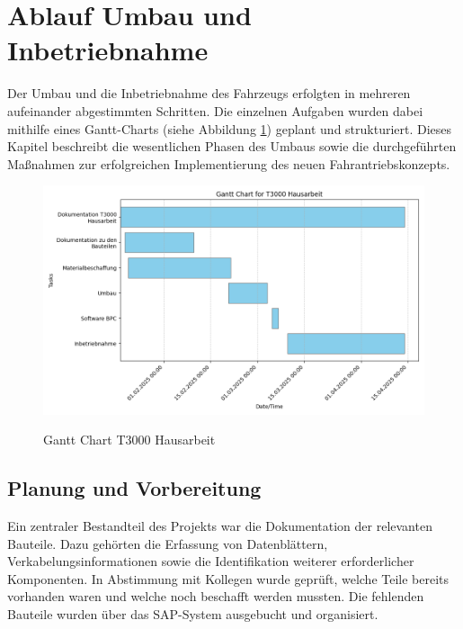 \documentclass[a4paper, 12pt]{article} %
\begin{document}
\section{Ablauf Umbau und Inbetriebnahme}
\begin{spacing}{1.5}  %
    \fontsize{14pt}{14pt}\selectfont  %

Der Umbau und die Inbetriebnahme des Fahrzeugs erfolgten in mehreren aufeinander abgestimmten Schritten.
 Die einzelnen Aufgaben wurden dabei mithilfe eines Gantt-Charts (siehe Abbildung \ref{ABBILDUNGEN}) geplant und strukturiert. 
 Dieses Kapitel beschreibt die wesentlichen Phasen des Umbaus sowie die durchgeführten 
Maßnahmen zur erfolgreichen Implementierung des neuen Fahrantriebskonzepts. 

\begin{figure}[H]
    \includegraphics[width=1\linewidth]{images/Gantt_Chart.png}\\[1ex]
    \centering
    \caption{Gantt Chart T3000 Hausarbeit}
    \label{ABBILDUNGEN}
\end{figure}

\subsection{Planung und Vorbereitung}
Ein zentraler Bestandteil des Projekts war die Dokumentation der relevanten Bauteile. Dazu gehörten die Erfassung von Datenblättern,
 Verkabelungsinformationen sowie die Identifikation weiterer erforderlicher Komponenten. In Abstimmung mit Kollegen wurde geprüft, 
 welche Teile bereits vorhanden waren und welche noch beschafft werden mussten. Die fehlenden Bauteile wurden über das \ac{SAP}-System ausgebucht 
 und organisiert.


\end{spacing}
\end{document}
